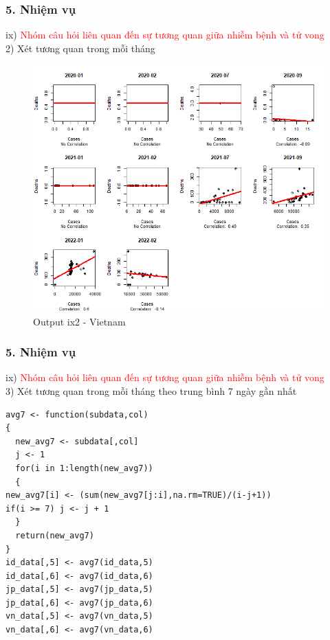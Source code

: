 \documentclass[english,10pt,table]{beamer}
\begin{document}
\begin{frame}[fragile]
\frametitle{5.  Nhiệm vụ}
ix) \textcolor{red}{Nhóm câu hỏi liên quan đến sự tương quan giữa nhiễm bệnh và tử vong}\\
    2) Xét tương quan trong mỗi tháng
	\begin{figure}[h!]
	\begin{center}
		    \includegraphics[scale = 0.36]{Images/IX/Vietnam.png}
		     \caption{Output ix2 - Vietnam}
		\end{center}
		\end{figure}
\end{frame}

\begin{frame}[fragile]
\frametitle{5.  Nhiệm vụ}
ix) \textcolor{red}{Nhóm câu hỏi liên quan đến sự tương quan giữa nhiễm bệnh và tử vong}\\
3) Xét tương quan trong mỗi tháng theo trung bình 7 ngày gần nhất
        \lstset{
    title=Avg 7 days function and Prep for ix3}
\begin{lstlisting}[frame=single]  
avg7 <- function(subdata,col)
{
  new_avg7 <- subdata[,col]
  j <- 1
  for(i in 1:length(new_avg7))
  {
new_avg7[i] <- (sum(new_avg7[j:i],na.rm=TRUE)/(i-j+1))
if(i >= 7) j <- j + 1
  }
  return(new_avg7)
}
id_data[,5] <- avg7(id_data,5)
id_data[,6] <- avg7(id_data,6)
jp_data[,5] <- avg7(jp_data,5)
jp_data[,6] <- avg7(jp_data,6)
vn_data[,5] <- avg7(vn_data,5)
vn_data[,6] <- avg7(vn_data,6)
\end{lstlisting}
\end{frame}
\end{document}
